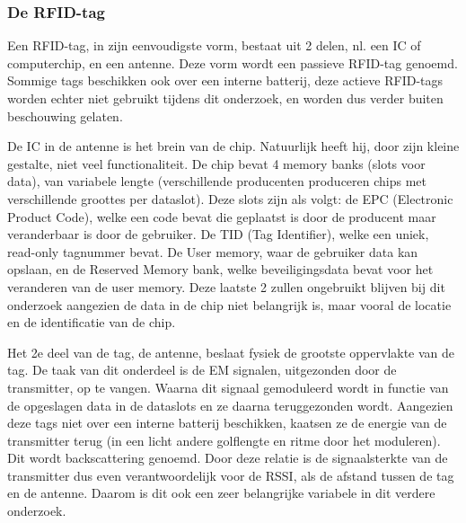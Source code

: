 \subsubsection{De RFID-tag}
Een RFID-tag, in zijn eenvoudigste vorm, bestaat uit 2 delen, nl. een IC of computerchip, en een antenne. Deze vorm wordt een passieve RFID-tag genoemd. Sommige tags beschikken ook over een interne batterij, deze actieve RFID-tags worden echter niet gebruikt tijdens dit onderzoek, en worden dus verder buiten beschouwing gelaten.\autocite{atlasrfidstore2022} 

De IC in de antenne is het brein van de chip. Natuurlijk heeft hij, door zijn kleine gestalte, niet veel functionaliteit. De chip bevat 4 memory banks (slots voor data), van variabele lengte (verschillende producenten produceren chips met verschillende groottes per dataslot). Deze slots zijn als volgt: de EPC (Electronic Product Code), welke een code bevat die geplaatst is door de producent maar veranderbaar is door de gebruiker. De TID (Tag Identifier), welke een uniek, read-only tagnummer bevat. De User memory, waar de gebruiker data kan opslaan, en de Reserved Memory bank, welke beveiligingsdata bevat voor het veranderen van de user memory.\autocite{Smiley2017} Deze laatste 2 zullen ongebruikt blijven bij dit onderzoek aangezien de data in de chip niet belangrijk is, maar vooral de locatie en de identificatie van de chip.

Het 2e deel van de tag, de antenne, beslaat fysiek de grootste oppervlakte van de tag. De taak van dit onderdeel is de EM signalen, uitgezonden door de transmitter, op te vangen. Waarna dit signaal gemoduleerd wordt in functie van de opgeslagen data in de dataslots en ze daarna teruggezonden wordt. Aangezien deze tags niet over een interne batterij beschikken, kaatsen ze de energie van de transmitter terug (in een licht andere golflengte en ritme door het moduleren). Dit wordt backscattering genoemd. Door deze relatie is de signaalsterkte van de transmitter dus even verantwoordelijk voor de RSSI, als de afstand tussen de tag en de antenne. Daarom is dit ook een zeer belangrijke variabele in dit verdere onderzoek.\autocite{atlasrfidstore2022a}

